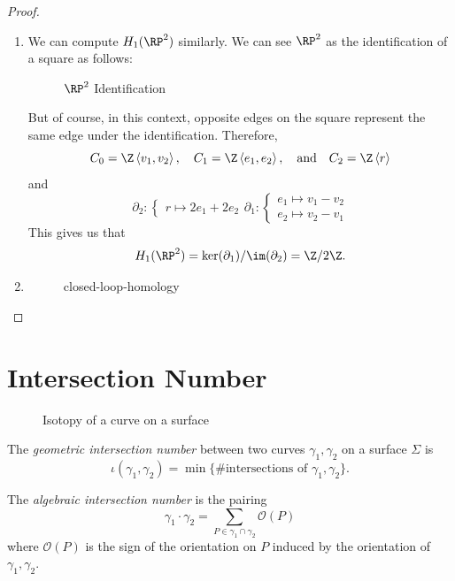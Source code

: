 \begin{proof}
\begin{enumerate}
		\item We can compute $H_1(\RP^2)$ similarly. We can see $\RP^2$ as the identification of a square as follows:
		\begin{figure}[H]
			\centering
			\caption{$\RP^2$ Identification}
			\label{fig:rp2-identification}
		\end{figure}
		But of course, in this context, opposite edges on the square represent the same edge under the identification. Therefore, \[C_0 = \Z\left< v_1,v_2 \right>, \quad C_1 = \Z\left< e_1,e_2 \right>, \quad \text{and} \quad C_2 = \Z\left< r \right>\] and \[
			\partial_2: \begin{cases}
				r \mapsto 2e_1 + 2e_2
			\end{cases}
			\partial_1: \begin{cases}
				e_1 \mapsto v_1 - v_2\\
				e_2 \mapsto v_2 - v_1
			\end{cases}
		\] This gives us that \[H_1(\RP^2) = \ker(\partial_1)/\im(\partial_2) = \Z/2\Z.\]
		\item 
		\begin{figure}[H]
			\centering
			\caption{closed-loop-homology}
			\label{fig:closed-loop-homology}
		\end{figure}
	\end{enumerate}
\end{proof}

\section{Intersection Number}
\begin{figure}[H]
    \centering
    \caption{Isotopy of a curve on a surface}
    \label{fig:intersection-straightened-out}
\end{figure}

\begin{definition}
	The \textit{geometric intersection number} between two curves $\gamma_1,\gamma_2$ on a surface $\Sigma$ is \[\iota(\gamma_1,\gamma_2) = \min\{\text{\# intersections of $\gamma_1,\gamma_2$}\}.\]
\end{definition}

\begin{definition}
	The \textit{algebraic intersection number} is the pairing \[\gamma_1 \cdot \gamma_2 = \sum_{P \in \gamma_1 \cap \gamma_2} \mathcal{O}(P)\] where $\mathcal{O}(P)$ is the sign of the orientation on $P$ induced by the orientation of $\gamma_1,\gamma_2$.
\end{definition}

